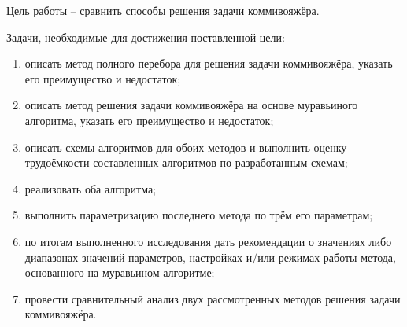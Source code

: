 
Цель работы -- сравнить способы решения задачи коммивояжёра.

Задачи, необходимые для достижения поставленной цели:
\begin{enumerate}
	\item описать метод полного перебора для решения задачи коммивояжёра, указать его преимущество и недостаток;
	\item описать метод решения задачи коммивояжёра на основе муравьиного алгоритма, указать его преимущество и недостаток;
	\item описать схемы алгоритмов для обоих методов и выполнить оценку трудоёмкости составленных алгоритмов по разработанным схемам;
	\item реализовать оба алгоритма;
	\item выполнить параметризацию последнего метода по трём его параметрам;
	\item по итогам выполненного исследования дать рекомендации о значениях либо диапазонах значений параметров, настройках и/или режимах работы метода, основанного на муравьином алгоритме;
	\item провести сравнительный анализ двух рассмотренных методов решения задачи коммивояжёра.
\end{enumerate}






